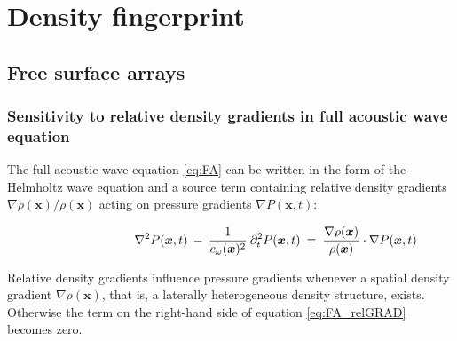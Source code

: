 \documentclass{article} %
\begin{document}
	\section{Density fingerprint} \label{sec:fingerprint}
	\subsection{Free surface arrays}
	\subsubsection*{Sensitivity to relative density gradients in full acoustic wave equation}

	The full acoustic wave equation \eqref{eq:FA} can be written in the form of the Helmholtz wave equation and a source term containing relative density gradients $\nabla \rho(\bm{x})/\rho(\bm{x})$ acting on pressure gradients $\nabla P(\bm{x},t)$:

	\begin{align}\label{eq:FA_relGRAD}
		\shoveright \shoveright \shoveright \shoveright \shoveright \shoveright \shoveright \shoveright %
		\; \nabla^{2} P(\bm{x},t) \: - \: \frac{1}{c_{\omega}(\bm{x})^{2}}  \: \partial_{t}^{2} P(\bm{x},t)  &\: = \: \frac{\nabla \rho(\bm{x})}{\rho(\bm{x})} \cdot \nabla P(\bm{x},t) 
	\end{align}

	Relative density gradients influence pressure gradients whenever a spatial density gradient $\nabla \rho(\bm{x})$, that is, a laterally heterogeneous density structure, exists. Otherwise the term on the right-hand side of equation \eqref{eq:FA_relGRAD} becomes zero.  \\
\end{document}
